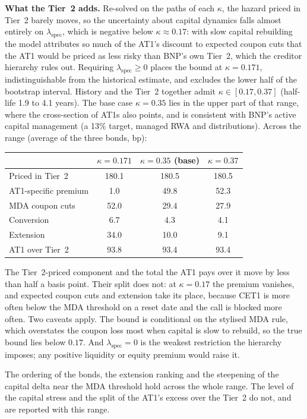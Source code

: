 \documentclass[11pt]{article}
\newcommand{\1}{\mathbf{1}}
\begin{document}
\textbf{What the Tier~2 adds.} Re-solved on the paths of each $\kappa$, the hazard
priced in Tier~2 barely moves, so the uncertainty about capital dynamics falls
almost entirely on $\lambda_{\mathrm{spec}}$, which is negative below
$\kappa\approx0.17$: with slow capital rebuilding the model attributes so much of
the AT1's discount to expected coupon cuts that the AT1 would be priced as less
risky than BNP's own Tier~2, which the creditor hierarchy rules out. Requiring
$\lambda_{\mathrm{spec}}\ge0$ places the bound at $\kappa=0.171$, indistinguishable
from the historical estimate, and excludes the lower half of the bootstrap
interval. History and the Tier~2 together admit $\kappa\in[0.17,0.37]$ (half-life
1.9 to 4.1 years). The base case $\kappa=0.35$ lies in the upper part of that range,
where the cross-section of AT1s also points, and is consistent with BNP's active
capital management (a 13\% target, managed RWA and distributions). Across the range
(average of the three bonds, bp):
\begin{center}
\begin{tabular}{lccc}
\toprule
 & $\kappa=0.171$ & $\kappa=0.35$ (base) & $\kappa=0.37$ \\
\midrule
Priced in Tier~2 & 180.1 & 180.5 & 180.5 \\
AT1-specific premium & 1.0 & 49.8 & 52.3 \\
MDA coupon cuts & 52.0 & 29.4 & 27.9 \\
Conversion & 6.7 & 4.3 & 4.1 \\
Extension & 34.0 & 10.0 & 9.1 \\
\midrule
AT1 over Tier~2 & 93.8 & 93.4 & 93.4 \\
\bottomrule
\end{tabular}
\end{center}
The Tier~2-priced component and the total the AT1 pays over it move by less than
half a basis point. Their split does not: at $\kappa=0.17$ the premium vanishes, and
expected coupon cuts and extension take its place, because CET1 is more often
below the MDA threshold on a reset date and the call is blocked more often. Two
caveats apply. The bound is conditional on the stylised MDA rule, which overstates
the coupon loss most when capital is slow to rebuild, so the true bound lies below
$0.17$. And $\lambda_{\mathrm{spec}}=0$ is the weakest restriction the hierarchy
imposes; any positive liquidity or equity premium would raise it.

The ordering of the bonds, the extension ranking and the steepening of the capital
delta near the MDA threshold hold across the whole range. The level of the capital
stress and the split of the AT1's excess over the Tier~2 do not, and are reported
with this range.
\end{document}

